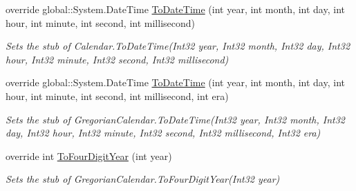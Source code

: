 \begin{DoxyCompactItemize}
override global\-::\-System.\-Date\-Time \hyperlink{class_system_1_1_globalization_1_1_fakes_1_1_stub_gregorian_calendar_a8c93c2b982d6e25cc76aa9889f36e25f}{To\-Date\-Time} (int year, int month, int day, int hour, int minute, int second, int millisecond)
\begin{DoxyCompactList}\small\item\em Sets the stub of Calendar.\-To\-Date\-Time(\-Int32 year, Int32 month, Int32 day, Int32 hour, Int32 minute, Int32 second, Int32 millisecond)\end{DoxyCompactList}\item 
override global\-::\-System.\-Date\-Time \hyperlink{class_system_1_1_globalization_1_1_fakes_1_1_stub_gregorian_calendar_aa93cd81377a5ce0f83c95cbaed3443bd}{To\-Date\-Time} (int year, int month, int day, int hour, int minute, int second, int millisecond, int era)
\begin{DoxyCompactList}\small\item\em Sets the stub of Gregorian\-Calendar.\-To\-Date\-Time(\-Int32 year, Int32 month, Int32 day, Int32 hour, Int32 minute, Int32 second, Int32 millisecond, Int32 era)\end{DoxyCompactList}\item 
override int \hyperlink{class_system_1_1_globalization_1_1_fakes_1_1_stub_gregorian_calendar_a54f1f94663289141fc7bd221a9754a5a}{To\-Four\-Digit\-Year} (int year)
\begin{DoxyCompactList}\small\item\em Sets the stub of Gregorian\-Calendar.\-To\-Four\-Digit\-Year(\-Int32 year)\end{DoxyCompactList}\end{DoxyCompactItemize}
